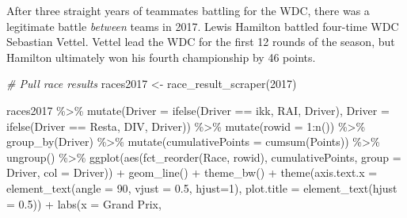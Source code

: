 \documentclass[
]{book}
\newenvironment{Shaded}{\begin{snugshade}}{\end{snugshade}}
\newcommand{\AttributeTok}[1]{\textcolor[rgb]{0.77,0.63,0.00}{#1}}
\newcommand{\CommentTok}[1]{\textcolor[rgb]{0.56,0.35,0.01}{\textit{#1}}}
\newcommand{\DecValTok}[1]{\textcolor[rgb]{0.00,0.00,0.81}{#1}}
\newcommand{\FloatTok}[1]{\textcolor[rgb]{0.00,0.00,0.81}{#1}}
\newcommand{\FunctionTok}[1]{\textcolor[rgb]{0.00,0.00,0.00}{#1}}
\newcommand{\NormalTok}[1]{#1}
\newcommand{\OtherTok}[1]{\textcolor[rgb]{0.56,0.35,0.01}{#1}}
\newcommand{\SpecialCharTok}[1]{\textcolor[rgb]{0.00,0.00,0.00}{#1}}
\newcommand{\StringTok}[1]{\textcolor[rgb]{0.31,0.60,0.02}{#1}}
\begin{document}
After three straight years of teammates battling for the WDC, there was a legitimate battle \emph{between} teams in 2017. Lewis Hamilton battled four-time WDC Sebastian Vettel. Vettel lead the WDC for the first 12 rounds of the season, but Hamilton ultimately won his fourth championship by 46 points.

\begin{Shaded}
\begin{Highlighting}[]
\CommentTok{\# Pull race results}
\NormalTok{races2017 }\OtherTok{\textless{}{-}} \FunctionTok{race\_result\_scraper}\NormalTok{(}\DecValTok{2017}\NormalTok{)}

\NormalTok{races2017 }\SpecialCharTok{\%\textgreater{}\%}
  \FunctionTok{mutate}\NormalTok{(}\AttributeTok{Driver =} \FunctionTok{ifelse}\NormalTok{(Driver }\SpecialCharTok{==} \StringTok{\textquotesingle{}ikk\textquotesingle{}}\NormalTok{, }\StringTok{\textquotesingle{}RAI\textquotesingle{}}\NormalTok{, Driver),}
         \AttributeTok{Driver =} \FunctionTok{ifelse}\NormalTok{(Driver }\SpecialCharTok{==} \StringTok{\textquotesingle{}Resta\textquotesingle{}}\NormalTok{, }\StringTok{\textquotesingle{}DIV\textquotesingle{}}\NormalTok{, Driver)) }\SpecialCharTok{\%\textgreater{}\%} 
  \FunctionTok{mutate}\NormalTok{(}\AttributeTok{rowid =} \DecValTok{1}\SpecialCharTok{:}\FunctionTok{n}\NormalTok{()) }\SpecialCharTok{\%\textgreater{}\%}
  \FunctionTok{group\_by}\NormalTok{(Driver) }\SpecialCharTok{\%\textgreater{}\%} 
  \FunctionTok{mutate}\NormalTok{(}\AttributeTok{cumulativePoints =} \FunctionTok{cumsum}\NormalTok{(Points)) }\SpecialCharTok{\%\textgreater{}\%}
  \FunctionTok{ungroup}\NormalTok{() }\SpecialCharTok{\%\textgreater{}\%} 
  \FunctionTok{ggplot}\NormalTok{(}\FunctionTok{aes}\NormalTok{(}\FunctionTok{fct\_reorder}\NormalTok{(Race, rowid), cumulativePoints,}
         \AttributeTok{group =}\NormalTok{ Driver, }\AttributeTok{col =}\NormalTok{ Driver)) }\SpecialCharTok{+}
  \FunctionTok{geom\_line}\NormalTok{() }\SpecialCharTok{+}
  \FunctionTok{theme\_bw}\NormalTok{() }\SpecialCharTok{+} 
  \FunctionTok{theme}\NormalTok{(}\AttributeTok{axis.text.x =} \FunctionTok{element\_text}\NormalTok{(}\AttributeTok{angle =} \DecValTok{90}\NormalTok{, }\AttributeTok{vjust =} \FloatTok{0.5}\NormalTok{, }\AttributeTok{hjust=}\DecValTok{1}\NormalTok{),}
        \AttributeTok{plot.title =} \FunctionTok{element\_text}\NormalTok{(}\AttributeTok{hjust =} \FloatTok{0.5}\NormalTok{)) }\SpecialCharTok{+}
  \FunctionTok{labs}\NormalTok{(}\AttributeTok{x =} \StringTok{\textquotesingle{}Grand Prix\textquotesingle{}}\NormalTok{,}

\end{Highlighting}
\end{Shaded}
\end{document}
